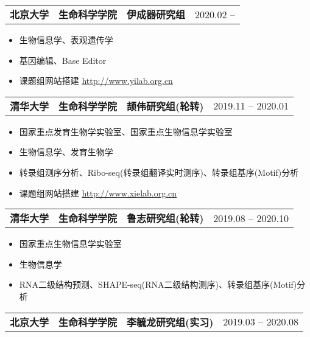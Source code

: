 \documentclass{resume}
\begin{document}
	\begin{tabularx}{\textwidth}{@{}X X X r@{}}
			\textbf{北京大学} & \textbf{生命科学学院} & \textbf{伊成器研究组} & 2020.02 -- \space\space\space\space\space\space\space\space\space\space\space\space\space\space \\
	\end{tabularx}

			\begin{itemize}
			 		\item 生物信息学、表观遗传学
					\item 基因编辑、Base Editor
					\item 课题组网站搭建	\hyperref[http://www.yilab.org.cn]{\underline{http://www.yilab.org.cn}}
			\end{itemize}



	\begin{tabularx}{\textwidth}{@{}X X X r@{}}
			\textbf{清华大学} & \textbf{生命科学学院} & \textbf{颉伟研究组(轮转)} & 2019.11 -- 2020.01 \\
	\end{tabularx}

			\begin{itemize}
					\item 国家重点发育生物学实验室、国家重点生物信息学实验室
					\item 生物信息学、发育生物学
					\item 转录组测序分析、Ribo-seq(转录组翻译实时测序)、转录组基序(Motif)分析
					\item 课题组网站搭建	\hyperref[http://www.xielab.org.cn]{\underline{http://www.xielab.org.cn}}
			\end{itemize}

	\begin{tabularx}{\textwidth}{@{}X X X r@{}}
			\textbf{清华大学} & \textbf{生命科学学院} & \textbf{鲁志研究组(轮转)} & 2019.08 -- 2020.10 \\
	\end{tabularx}

			\begin{itemize}
					\item 国家重点生物信息学实验室
					\item 生物信息学
					\item RNA二级结构预测、SHAPE-seq(RNA二级结构测序)、转录组基序(Motif)分析
			\end{itemize}
		
	\begin{tabularx}{\textwidth}{@{}X X X r@{}}
			\textbf{北京大学} & \textbf{生命科学学院} & \textbf{李毓龙研究组(实习)} & 2019.03 -- 2020.08 \\
	\end{tabularx}
\end{document}

